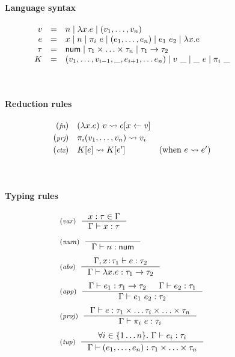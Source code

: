 \begin{figure}[t]
\paragraph{Language syntax}
\begin{equation*}
\begin{array}{rcl}
  v &  = & n \; | \; \lambda x.e \; | \; (v_1, \ldots, v_n) \\
  e &  = & x \; | \; n \; | \; \pi_i~e \; | \; (e_1, \ldots, e_n) \; | \; e_1~e_2 \; | \; \lambda x.e \\
  \tau &  = & \textnormal{\sffamily num} \; | \; \tau_1 \times \ldots \times \tau_n \; | \; \tau_1 \rightarrow \tau_2 \\
  K  & = & (v_1, \ldots, v_{i-1}, \_, e_{i+1}, \ldots e_n) \; | \; v~\_ \; | \; \_~e \; | \; \pi_i~\_
\end{array}
\end{equation*}

~
\paragraph{Reduction rules}
\begin{equation*}
\begin{array}{rll}
  \footnotesize{(\emph{fn})}  & (\lambda x.e)~v \rightsquigarrow e[x\leftarrow v] \\[0.25em]
  \footnotesize{(\emph{prj})} & \pi_i (v_1, \ldots, v_n) \rightsquigarrow v_i\\[0.25em]
  \footnotesize{(\emph{ctx})}  & K[e] \rightsquigarrow K[e']  & (\textnormal{when}~e\rightsquigarrow e')\\[0.25em]
\end{array}
\end{equation*}

~
\paragraph{Typing rules}
\begin{equation*}
\begin{array}{l}
\tyrule{var}
  { x:\tau \in \Gamma }
  { \Gamma \vdash x:\tau }
\\[1.25em]
\tyrule{num}
  { ~ }
  { \Gamma \vdash n:\ident{num} }
\\[1.25em]
\tyrule{abs}
  { \Gamma, x\!:\!\tau_1 \vdash e : \tau_2 }
  { \Gamma \vdash \lambda x.e : \tau_1 \rightarrow \tau_2 }
\\[1.25em]
\tyrule{app}
  { \Gamma \vdash e_1 : \tau_1 \rightarrow \tau_2  & \Gamma \vdash e_2 : \tau_1 }
  { \Gamma \vdash e_1~e_2 : \tau_2 }
\\[1.25em]
\tyrule{proj}
  { \Gamma \vdash e : \tau_1 \times \ldots \tau_i \times \ldots \times \tau_n }
  { \Gamma \vdash \pi_i~e:\tau_i }
\\[1.25em]
\tyrule{tup}
  { \forall i\in\{1 \ldots n\}.~ \Gamma \vdash e_i : \tau_i }
  { \Gamma \vdash (e_1, \ldots, e_n) : \tau_1 \times \ldots \times \tau_n }
\end{array}
\end{equation*}

\label{fig:semantics-target}
\end{figure}


